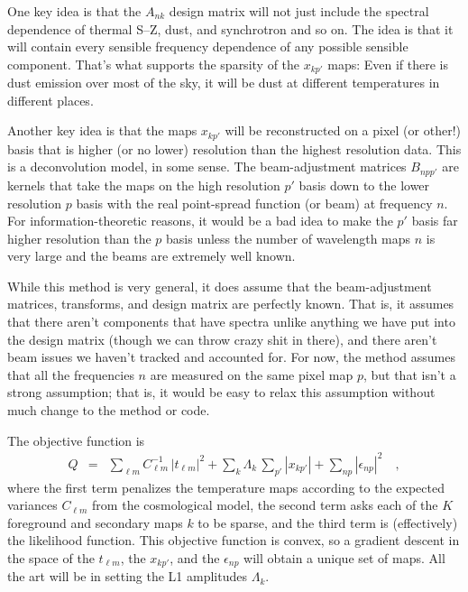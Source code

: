 \documentclass[11pt]{article}
\begin{document}
One key idea is that the $A_{nk}$ design matrix will not just include the
spectral dependence of thermal S--Z, dust, and synchrotron and so
on. The idea is that it will contain every sensible frequency
dependence of any possible sensible component. That's what supports
the sparsity of the $x_{kp'}$ maps: Even if there is dust emission
over most of the sky, it will be dust at different temperatures in
different places.

Another key idea is that the maps $x_{kp'}$ will be reconstructed on a
pixel (or other!) basis that is higher (or no lower) resolution than
the highest resolution data. This is a deconvolution model, in some
sense.  The beam-adjustment matrices $B_{npp'}$ are kernels that take
the maps on the high resolution $p'$ basis down to the lower
resolution $p$ basis with the real point-spread function (or beam) at
frequency $n$. For information-theoretic reasons, it would be a bad
idea to make the $p'$ basis far higher resolution than the $p$ basis
unless the number of wavelength maps $n$ is very large and the beams
are extremely well known.

While this method is very general, it does assume that the
beam-adjustment matrices, transforms, and design matrix are perfectly
known. That is, it assumes that there aren't components that have
spectra unlike anything we have put into the design matrix (though we
can throw crazy shit in there), and there aren't beam issues we
haven't tracked and accounted for. For now, the method assumes that
all the frequencies $n$ are measured on the same pixel map $p$, but
that isn't a strong assumption; that is, it would be easy to relax
this assumption without much change to the method or code.

The objective function is
\begin{eqnarray}
  Q &=&
    \sum_{\ell m} C_{\ell m}^{-1}\,|t_{\ell m}|^2
  + \sum_{k} \Lambda_k\,\sum_{p'} |x_{kp'}|
  + \sum_{np} |\epsilon_{np}|^2 \quad ,
\end{eqnarray}
where the first term penalizes the temperature maps according to the
expected variances $C_{\ell m}$ from the cosmological model, the
second term asks each of the $K$ foreground and secondary maps $k$ to
be sparse, and the third term is (effectively) the likelihood
function.
This objective function is convex, so a gradient descent in the space
of the $t_{\ell m}$, the $x_{kp'}$, and the $\epsilon_{np}$ will
obtain a unique set of maps.
All the art will be in setting the L1 amplitudes $\Lambda_k$.
\end{document}
